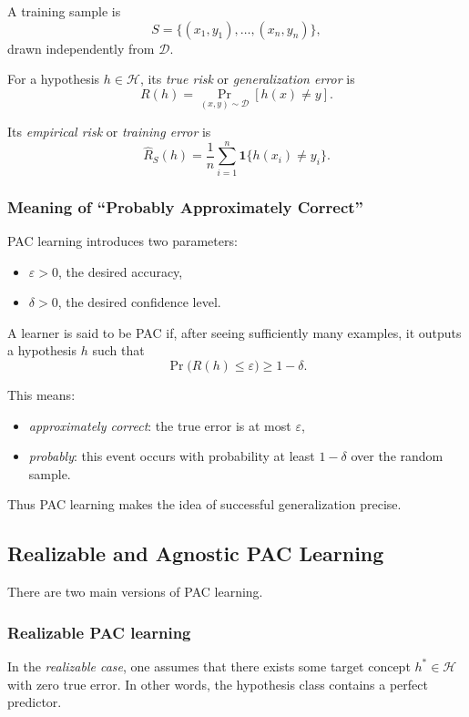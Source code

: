 A training sample is
\[
S = \{(x_1,y_1),\dots,(x_n,y_n)\},
\]
drawn independently from \(\mathcal{D}\).

For a hypothesis \(h \in \mathcal{H}\), its \emph{true risk} or \emph{generalization error} is
\[
R(h)=\Pr_{(x,y)\sim \mathcal{D}}[h(x)\neq y].
\]

Its \emph{empirical risk} or \emph{training error} is
\[
\hat{R}_S(h)=\frac{1}{n}\sum_{i=1}^n \mathbf{1}\{h(x_i)\neq y_i\}.
\]

\subsubsection{Meaning of ``Probably Approximately Correct''}

PAC learning introduces two parameters:
\begin{itemize}
    \item \(\varepsilon > 0\), the desired accuracy,
    \item \(\delta > 0\), the desired confidence level.
\end{itemize}

A learner is said to be PAC if, after seeing sufficiently many examples, it outputs a hypothesis \(h\) such that
\[
\Pr\big(R(h)\le \varepsilon\big)\ge 1-\delta.
\]

This means:
\begin{itemize}
    \item \emph{approximately correct}: the true error is at most \(\varepsilon\),
    \item \emph{probably}: this event occurs with probability at least \(1-\delta\) over the random sample.
\end{itemize}

Thus PAC learning makes the idea of successful generalization precise.

\subsection{Realizable and Agnostic PAC Learning}

There are two main versions of PAC learning.

\subsubsection{Realizable PAC learning}

In the \emph{realizable case}, one assumes that there exists some target concept \(h^* \in \mathcal{H}\) with zero true error. In other words, the hypothesis class contains a perfect predictor.

